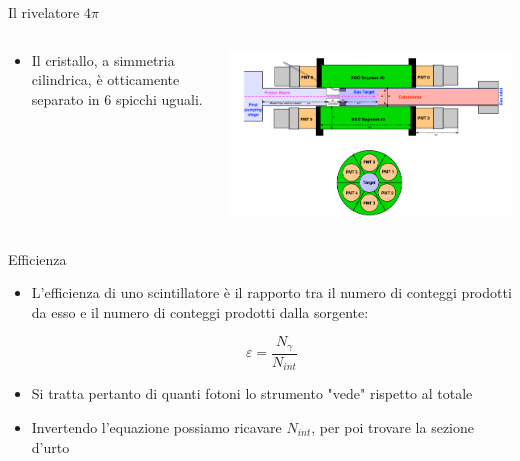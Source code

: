 \documentclass [xcolor=svgnames, 9pt] {beamer}
\begin{document}
\begin{frame}[noframenumbering]{Il rivelatore $4\pi$}
	\begin{columns}
		\begin{column}{0.45\textwidth}
			\begin{itemize}%
				\item Il cristallo, a simmetria cilindrica, è otticamente separato in 6 spicchi uguali.
			\end{itemize}
		\end{column}
		\begin{column}{0.45\textwidth}
			\centering
			\includegraphics[width=\textwidth]{img/BGO.png}%
		\end{column}
	\end{columns}
\end{frame}


\begin{frame}[noframenumbering]{Efficienza}
	\begin{itemize}
			\item L'efficienza di uno scintillatore è il rapporto tra il numero di conteggi prodotti da esso e il numero di conteggi prodotti dalla sorgente:
			
			\begin{equation}
					\varepsilon = \dfrac{N_{\gamma}}{N_{int}}
				\end{equation}
			
			\item Si tratta pertanto di quanti fotoni lo strumento "vede" rispetto al totale
			\item Invertendo l'equazione possiamo ricavare $N_{int}$, per poi trovare la sezione d'urto
		\end{itemize}
\end{frame}
\end{document}
